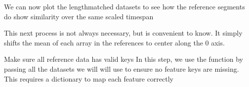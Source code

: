 \documentclass[letterpaper,10pt,english]{sphinxmanual}
\begin{document}
\begin{sphinxVerbatim}[commandchars=\\\{\}]
  
\end{sphinxVerbatim}

\sphinxAtStartPar
We can now plot the length\sphinxhyphen{}matched datasets to see how the reference segments do show 
similarity over the same scaled timespan

\begin{sphinxVerbatim}[commandchars=\\\{\}]
   \PYG{p}{[}           \PYG{p}{]}  
\end{sphinxVerbatim}

\begin{figure}[htbp]
\centering

\noindent{}
\end{figure}

\sphinxAtStartPar
This next process is not always necessary, but is convenient to know. It simply shifts the mean
of each array in the references to center along the 0 axis.

\begin{sphinxVerbatim}[commandchars=\\\{\}]
  
\end{sphinxVerbatim}

\sphinxAtStartPar
Make sure all reference data has valid keys
In this step, we use the  function by passing all the datasets we will will use
to ensure no feature keys are missing. This requires a dictionary to map each feature correctly
\end{document}
